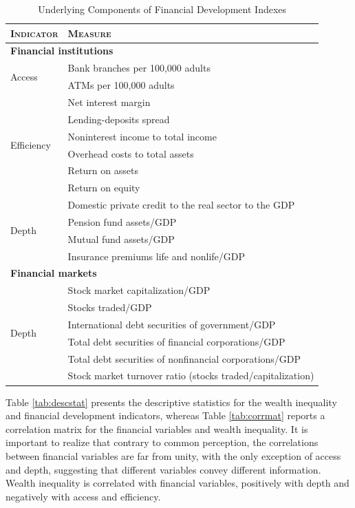 \documentclass[a4paper,11pt]{article}
\begin{document}
\begin{table}[ht!]
\small
\caption{Underlying Components of Financial Development Indexes}
\label{tab:components}
\centering
\begin{tabular}{ll}
  \toprule
  \textsc{Indicator} & \textsc{Measure} \\
  \midrule
  \multicolumn{2}{l}{\textbf{Financial institutions}} \\
  \midrule
  \multirow{2}{*}{Access} 	& Bank branches per 100,000 adults \\
  							& ATMs per 100,000 adults \\
  \midrule
  \multirow{6}{*}{Efficiency}		& Net interest margin \\
  							& Lending-deposits spread \\ 
  							& Noninterest income to total income \\
  							& Overhead costs to total assets \\
  							& Return on assets \\
  							& Return on equity \\
		
  \midrule
  \multirow{4}{*}{Depth}	& Domestic private credit to the real sector to the GDP \\
  							& Pension fund assets/GDP \\
  							& Mutual fund assets/GDP \\
  							& Insurance premiums life and nonlife/GDP \\
  \midrule
  \multicolumn{2}{l}{\textbf{Financial markets}} \\
  \midrule
  \multirow{6}{*}{Depth} 	& Stock market capitalization/GDP \\
  							& Stocks traded/GDP \\
  							& International debt securities of government/GDP \\
  							& Total debt securities of financial corporations/GDP \\
  							& Total debt securities of nonfinancial corporations/GDP \\
  \midrule
  Efficiency			& Stock market turnover ratio (stocks traded/capitalization) \\
  \bottomrule
\end{tabular}
\end{table}
%
%
%
Table \ref{tab:descstat} presents the descriptive statistics for the wealth inequality and financial development indicators, whereas Table \ref{tab:corrmat} reports a correlation matrix for the financial variables and wealth inequality. It is important to realize that contrary to common perception, the correlations between financial variables are far from unity, with the only exception of access and depth, suggesting that different variables convey different information. Wealth inequality is correlated with financial variables, positively with depth and negatively with access and efficiency.
\end{document}
